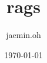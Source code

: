 \documentclass{amsart}
\date{\today}
\begin{document}
\author{jaemin.oh}
\title{rags}

\maketitle

\end{document}
